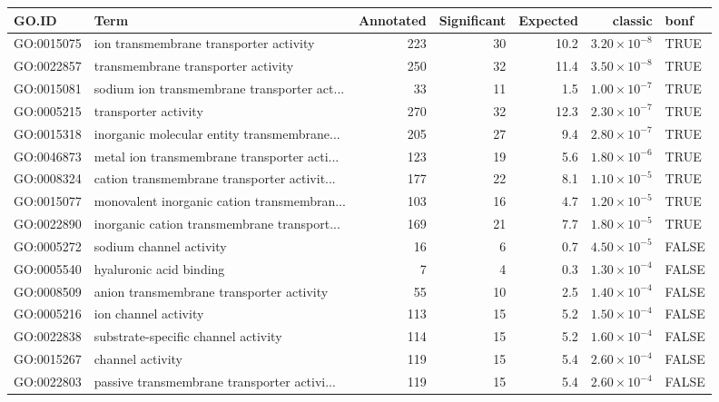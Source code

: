 \begin{table}[ht]
\centering
\begin{adjustbox}{max width=\textwidth}
\begin{tabular}{llrrrrl}
  \hline
GO.ID & Term & Annotated & Significant & Expected & classic & bonf \\ 
  \hline
GO:0015075 & ion transmembrane transporter activity & 223 & 30 & 10.2 & $3.20 \times 10^{-8}$ & TRUE \\ 
  GO:0022857 & transmembrane transporter activity & 250 & 32 & 11.4 & $3.50 \times 10^{-8}$ & TRUE \\ 
  GO:0015081 & sodium ion transmembrane transporter act... & 33 & 11 & 1.5 & $1.00 \times 10^{-7}$ & TRUE \\ 
  GO:0005215 & transporter activity & 270 & 32 & 12.3 & $2.30 \times 10^{-7}$ & TRUE \\ 
  GO:0015318 & inorganic molecular entity transmembrane... & 205 & 27 & 9.4 & $2.80 \times 10^{-7}$ & TRUE \\ 
  GO:0046873 & metal ion transmembrane transporter acti... & 123 & 19 & 5.6 & $1.80 \times 10^{-6}$ & TRUE \\ 
  GO:0008324 & cation transmembrane transporter activit... & 177 & 22 & 8.1 & $1.10 \times 10^{-5}$ & TRUE \\ 
  GO:0015077 & monovalent inorganic cation transmembran... & 103 & 16 & 4.7 & $1.20 \times 10^{-5}$ & TRUE \\ 
  GO:0022890 & inorganic cation transmembrane transport... & 169 & 21 & 7.7 & $1.80 \times 10^{-5}$ & TRUE \\ 
  GO:0005272 & sodium channel activity & 16 & 6 & 0.7 & $4.50 \times 10^{-5}$ & FALSE \\ 
  GO:0005540 & hyaluronic acid binding & 7 & 4 & 0.3 & $1.30 \times 10^{-4}$ & FALSE \\ 
  GO:0008509 & anion transmembrane transporter activity & 55 & 10 & 2.5 & $1.40 \times 10^{-4}$ & FALSE \\ 
  GO:0005216 & ion channel activity & 113 & 15 & 5.2 & $1.50 \times 10^{-4}$ & FALSE \\ 
  GO:0022838 & substrate-specific channel activity & 114 & 15 & 5.2 & $1.60 \times 10^{-4}$ & FALSE \\ 
  GO:0015267 & channel activity & 119 & 15 & 5.4 & $2.60 \times 10^{-4}$ & FALSE \\ 
  GO:0022803 & passive transmembrane transporter activi... & 119 & 15 & 5.4 & $2.60 \times 10^{-4}$ & FALSE \\ 

\end{tabular}
\end{adjustbox}
\end{table}

